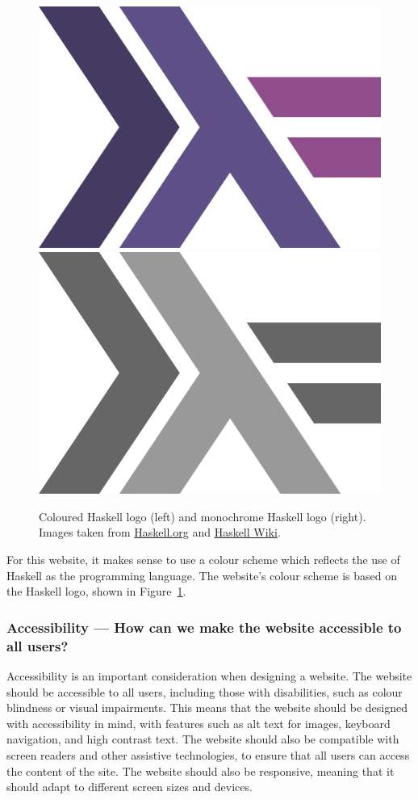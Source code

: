 \documentclass[../main.tex]{subfiles}
\begin{document}
                \begin{figure}[H]
                    \centering
                    \includegraphics[width=0.25\linewidth]{images/haskell.png}
                    \includegraphics[width=0.25\linewidth]{images/haskellGrey.png}
                        \caption{Coloured Haskell logo (left) and monochrome Haskell logo (right).
                            Images taken from \href{https://www.haskell.org/}{Haskell.org} and
                                \href{https://wiki.haskell.org/Haskell_logos}{Haskell Wiki}.
                        }
                        \label{fig:haskell}
                \end{figure}

                For this website, it makes sense to use a colour scheme which reflects the use
                    of Haskell as the programming language.
                The website's colour scheme is based on the Haskell logo, shown in
                    Figure~\ref{fig:haskell}.

            \subsubsection{Accessibility — How can we make the website accessible to all users?}
                Accessibility is an important consideration when designing a website.
                The website should be accessible to all users, including those with
                    disabilities, such as colour blindness or visual impairments.
                This means that the website should be designed with accessibility in mind, with
                    features such as alt text for images, keyboard navigation, and high contrast
                    text.
                The website should also be compatible with screen readers and other assistive
                    technologies, to ensure that all users can access the content of the site.
                The website should also be responsive, meaning that it should adapt to
                    different screen sizes and devices.
\end{document}
